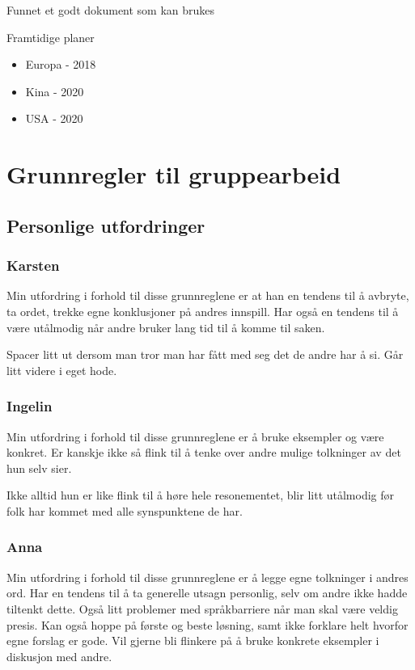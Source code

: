 \documentclass[5p]{elsarticle}
\begin{document}
Funnet et godt dokument som kan brukes

Framtidige planer
\begin{itemize}
\item Europa - 2018
\item Kina - 2020
\item USA - 2020
\end{itemize}


\section*{Grunnregler til gruppearbeid}

\subsection*{Personlige utfordringer}

\subsubsection*{Karsten}
Min utfordring i forhold til disse grunnreglene er at han en tendens til å avbryte, ta ordet, trekke egne konklusjoner på andres innspill. Har også en tendens til å være utålmodig når andre bruker lang tid til å komme til saken.

Spacer litt ut dersom man tror man har fått med seg det de andre har å si. Går litt videre i eget hode.

\subsubsection*{Ingelin}
Min utfordring i forhold til disse grunnreglene er å bruke eksempler og være konkret. Er kanskje ikke så flink til å tenke over andre mulige tolkninger av det hun selv sier.

Ikke alltid hun er like flink til å høre hele resonementet, blir litt utålmodig før folk har kommet med alle synspunktene de har.

\subsubsection*{Anna}
Min utfordring i forhold til disse grunnreglene er å legge egne tolkninger i andres ord. Har en tendens til å ta generelle utsagn personlig, selv om andre ikke hadde tiltenkt dette. Også litt problemer med språkbarriere når man skal være veldig presis. Kan også hoppe på første og beste løsning, samt ikke forklare helt hvorfor egne forslag er gode. Vil gjerne bli flinkere på å bruke konkrete eksempler i diskusjon med andre.
\end{document}
